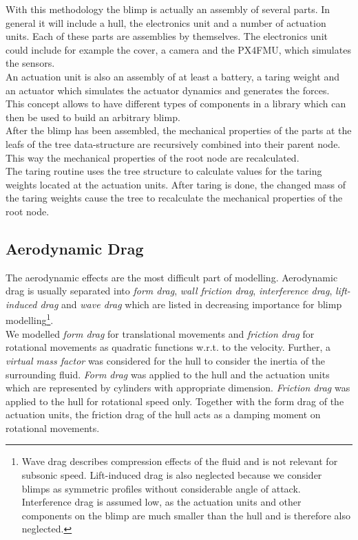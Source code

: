 With this methodology the blimp is actually an assembly of several parts. 
In general it will include a hull, the electronics unit and a number of actuation units.
Each of these parts are assemblies by themselves.
The electronics unit could include for example the cover, a camera and the PX4FMU, which simulates the sensors.\\
An actuation unit is also an assembly of at least a battery, a taring weight and an actuator which simulates the actuator dynamics and generates the forces.\\
This concept allows to have different types of components in a library which can then be used to build an arbitrary blimp. \\

After the blimp has been assembled, the mechanical properties of the parts at the leafs of the tree data-structure are recursively combined into their parent node.
This way the mechanical properties of the root node are recalculated.\\
The taring routine uses the tree structure to calculate values for the taring weights located at the actuation units. 
After taring is done, the changed mass of the taring weights cause the tree to recalculate the mechanical properties of the root node.

\subsection{Aerodynamic Drag}
\label{sub:aero_drag}
The aerodynamic effects are the most difficult part of modelling.
Aerodynamic drag is usually separated into \textit{form drag}, \textit{wall friction drag}, \textit{interference drag}, \textit{lift-induced drag} and \textit{wave drag} which are listed in decreasing importance for blimp modelling\footnote{
Wave drag describes compression effects of the fluid and is not relevant for subsonic speed.
Lift-induced drag is also neglected because we consider blimps as symmetric profiles without considerable angle of attack.
Interference drag is assumed low, as the actuation units and other components on the blimp are much smaller than the hull and is therefore also neglected.
}.\\

We modelled \textit{form drag} for translational movements and \textit{friction drag} for rotational movements as quadratic functions w.r.t. to the velocity.
Further, a \textit{virtual mass factor} was considered for the hull to consider the inertia of the surrounding fluid.
\textit{Form drag} was applied to the hull and the actuation units which are represented by cylinders with appropriate dimension.
\textit{Friction drag} was applied to the hull for rotational speed only.
Together with the form drag of the actuation units, the friction drag of the hull acts as a damping moment on rotational movements.\\

